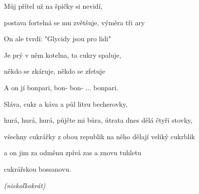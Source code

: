 \begin{song}
\bigskip
\Refren
\bigskip

Můj přítel  už na špičky si nevidí,  \par
postava fortelná se mu zvětšuje, výměra tři ary  \par
On ale tvrdí:  "Glycidy jsou pro lidi"  \par
Je prý v něm kotelna, ta cukry spaluje, \par
někdo se zkáruje, někdo se zfetuje \par
A on jí bonpari, bon- bon- ...   bonpari.  \par

\bigskip

Sláva,  cukr a káva a půl litru becherovky, \par
{}hurá, hurá, hurá, půjčte mi bůra, útrata dnes dělá čtyři stovky, \par
všechny cukrářky z obou republik na něho dělají veliký cukrblik \par
a on jim za odměnu zpívá zas a znovu tuhletu  \par
cukrářskou bossanovu.    \par

\bigskip

\Outro \par
{}    \textit{(niekoľkokrát)} \par
{} \par

\end{song}
